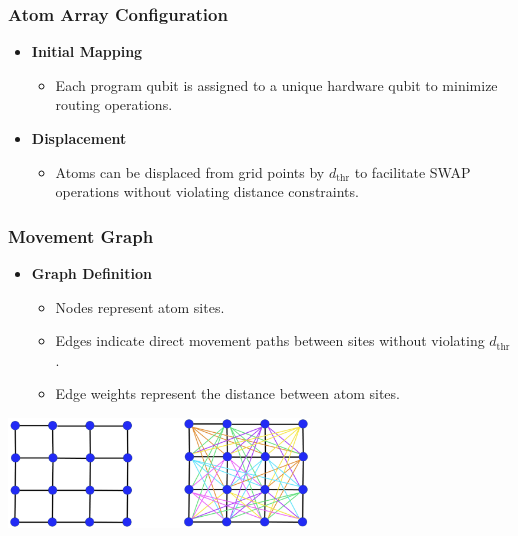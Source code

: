 \documentclass[18 pt]{beamer}
\begin{document}
\begin{frame}
    \frametitle{Atom Array Configuration}
    \begin{itemize}
        \item \textbf{Initial Mapping}
        \begin{itemize}
            \item Each program qubit is assigned to a unique hardware qubit to minimize routing operations.
        \end{itemize}
        \item \textbf{Displacement}
        \begin{itemize}
            \item Atoms can be displaced from grid points by $d_{\text{thr}}$ to facilitate SWAP operations without violating distance constraints.
        \end{itemize}
    \end{itemize}
\end{frame}

\begin{frame}
    \frametitle{Movement Graph}
    \begin{itemize}
        \item \textbf{Graph Definition}
        \begin{itemize}
            \item Nodes represent atom sites.
            \item Edges indicate direct movement paths between sites without violating $d_{\text{thr}}$.
            \item Edge weights represent the distance between atom sites.
        \end{itemize}
    \end{itemize}
    \begin{center}
        \includegraphics[width=0.6\textwidth]{move.png}
    \end{center}
\end{frame}
\end{document}

